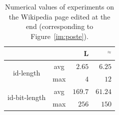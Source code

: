 \begin{table}[h]
\addtolength{\belowcaptionskip}{-15pt}
  \begin{center}
    \begin{tabular}{|c|c|r|r|}
      \cline{3-4}
      \multicolumn{2}{c|}{} &\textbf{L} &\textbf{\NAME{}}$^\approx$\\
      \cline{3-4}
      \hline
      \multirow{2}{*}{id-length} & avg & $2.65$ & $6.25$ \\
      \cline{2-4}
      &  max & $4$ & $12$ \\
      \hline
      \hline
      \multirow{2}{*}{id-bit-length} & avg & $169.7$ & $61.24$\\
      \cline{2-4}
      & max & $256$ & $150$ \\
      \hline
    \end{tabular}
    \caption{Numerical values of experiments on the Wikipedia page edited at
      the end (corresponding to Figure~\ref{im:poste}).}
    \label{tab:queuePage}
  \end{center}
\end{table}


